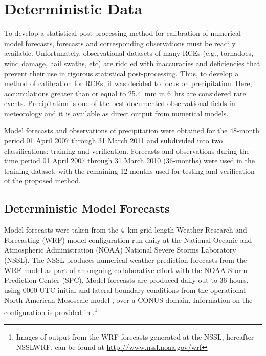

\section{Deterministic Data}
\label{ddata}

To develop a statistical post-processing method for calibration of numerical model forecasts, forecasts and corresponding observations must be readily available. Unfortunately, observational datasets of many RCEs (e.g., tornadoes, wind damage, hail swaths, etc) are riddled with inaccuracies and deficiencies \citep{Doswell1988, Weiss2002, Trapp2006, Ortega2009} that prevent their use in rigorous statistical post-processing. Thus, to develop a method of calibration for RCEs, it was decided to focus on precipitation. Here, accumulations greater than or equal to \mbox{25.4 mm} in \mbox{6 hrs} are considered rare events. Precipitation is one of the best documented observational fields in meteorology and it is available as direct output from numerical models.

Model forecasts and observations of precipitation were obtained for the 48-month period 01 April 2007 through 31 March 2011 and subdivided into two classifications: training and verification. Forecasts and observations during the time period 01 April 2007 through 31 March 2010 (36-months) were used in the training dataset, with the remaining 12-months used for testing and verification of the proposed method.




\subsection{Deterministic Model Forecasts}
\label{dmodel}

Model forecasts were taken from the \mbox{4 km} grid-length Weather Research and Forecasting (WRF) model configuration \citep{WRFV3} run daily at the National Oceanic and Atmospheric Administration (NOAA) National Severe Storms Laboratory (NSSL). The NSSL produces numerical weather prediction forecasts from the WRF model as part of an ongoing collaborative effort with the NOAA Storm Prediction Center (SPC). Model forecasts are produced daily out to 36 hours, using 0000 UTC initial and lateral boundary conditions from the operational North American Mesoscale model \citep{NAM}, over a CONUS domain. Information on the configuration is provided in \cite{Kain2010}.\footnote{Images of output from the WRF forecasts generated at the NSSL, hereafter NSSLWRF, can be found at \url{http://www.nssl.noaa.gov/wrf}}




